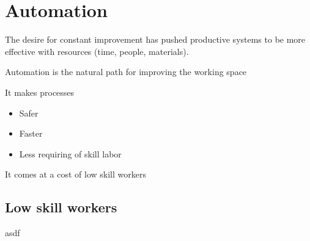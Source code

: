 
\section{Automation} 

The desire for constant improvement has pushed productive systems to be more effective with resources (time, people, materials).

Automation is the natural path for improving the working space

It makes processes
\begin{itemize}
	\item Safer
	\item Faster
	\item Less requiring of skill labor
\end{itemize}

It comes at a cost of low skill workers

\subsection{Low skill workers} 

asdf

